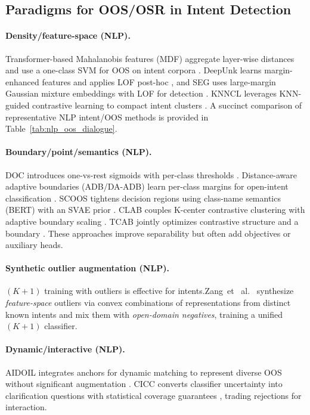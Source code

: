 \documentclass[journal,letterpaper]{IEEEtran}
\begin{document}
\subsection{Paradigms for OOS/OSR in Intent Detection}

\paragraph{Density/feature-space (NLP).}
Transformer-based Mahalanobis features (MDF) aggregate layer-wise distances and use a one-class SVM for OOS on intent corpora \cite{xu-etal-2021-unsupervised}. DeepUnk learns margin-enhanced features and applies LOF post-hoc \cite{lin-xu-2019-deep}, and SEG uses large-margin Gaussian mixture embeddings with LOF for detection \cite{yan-etal-2020-unknown}. KNNCL leverages KNN-guided contrastive learning to compact intent clusters \cite{zhou-etal-2022-knn}. \noindent A succinct comparison of representative NLP intent/OOS methods is provided in Table~\ref{tab:nlp_oos_dialogue}.


\paragraph{Boundary/point/semantics (NLP).}
DOC introduces one-vs-rest sigmoids with per-class thresholds \cite{shu-etal-2017-doc}. Distance-aware adaptive boundaries (ADB/DA-ADB) learn per-class margins for open-intent classification \cite{Zhang_2021, DA-ADB_2023}. SCOOS tightens decision regions using class-name semantics (BERT) with an SVAE prior \cite{gautam2024scoos}. CLAB couples K-center contrastive clustering with adaptive boundary scaling \cite{liu2023clab}. TCAB jointly optimizes contrastive structure and a boundary \cite{chen2024tcab}. These approaches improve separability but often add objectives or auxiliary heads.


\paragraph{Synthetic outlier augmentation (NLP).}
$(K{+}1)$ training with outliers is effective for intents.Zang~et~ al.~\cite{Zhan_2021} synthesize \emph{feature-space} outliers via convex combinations of representations from distinct known intents and mix them with \emph{open-domain negatives}, training a unified $(K{+}1)$ classifier.
 
\paragraph{Dynamic/interactive (NLP).}
AIDOIL integrates anchors for dynamic matching to represent diverse OOS without significant augmentation \cite{yin2025aidoil}. CICC converts classifier uncertainty into clarification questions with statistical coverage guarantees \cite{hengst2024cicc}, trading rejections for interaction.
\end{document}
